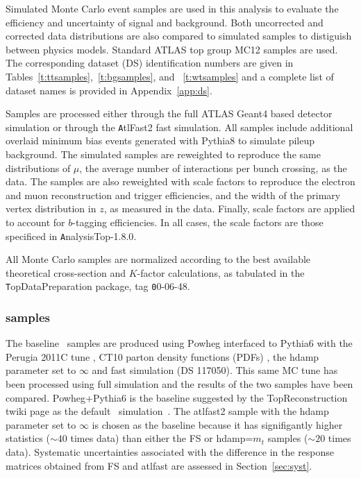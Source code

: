 Simulated Monte Carlo event samples are used in this analysis to evaluate the efficiency and uncertainty of signal and background.  Both uncorrected and corrected data distributions are also compared to simulated samples to distiguish between physics models. 
Standard ATLAS top group MC12 samples are used.~\cite{topmc} The corresponding dataset (DS) identification numbers are given  in Tables~\ref{t:ttsamples},~\ref{t:bgsamples}, and ~\ref{t:wtsamples} and a complete list of dataset names is provided in Appendix~\ref{app:ds}.

Samples are processed either through the full ATLAS Geant4\cite{bib:g4} based detector simulation or through the {\texttt AtlFast2}\cite{atlfast2} fast simulation. All samples include additional overlaid minimum bias events generated with {\textsc  Pythia8} \cite{pythia8} to simulate pileup background. 
The simulated samples are reweighted to reproduce the same distributions of $\mu$, the average number of interactions per bunch crossing, as the data. The samples are also reweighted with scale factors to reproduce the electron and muon reconstruction and trigger efficiencies, and the width of the primary vertex distribution in $z$, as measured in the data. Finally, scale factors are applied to account for $b$-tagging efficiencies.  In all cases,
the scale factors are those specificed in {\texttt AnalysisTop-1.8.0}.

All Monte Carlo samples are normalized according to the best available theoretical cross-section and $K$-factor calculations, as tabulated in the {\texttt TopDataPreparation} package, tag {\texttt 00-06-48}.

\subsubsection{\ttbar samples}\label{ss:mcsignal}

The baseline \ttbar\ samples are produced using {\textsc  Powheg} \cite{Powheg, Powheg2, Powheg3, Powheg4} interfaced to {\textsc  Pythia6} \cite{pythia6} with the Perugia 2011C tune \cite{perugia}, CT10 parton density functions (PDFs) \cite{cttenpdf}, the hdamp parameter set to $\infty$ and fast simulation (DS 117050).  
This same MC tune has been processed using full simulation and the results of the two samples have been compared.
{\textsc  Powheg}+{\textsc  Pythia6} is the baseline suggested by the TopReconstruction twiki page as the default \ttbar\ simulation~\cite{topmc}. The atlfast2 sample with the hdamp parameter set to $\infty$ is chosen as the baseline because it has signifigantly higher statistics ($\sim 40$ times data) than either the FS or hdamp=$m_t$ samples ($\sim 20$ times data).
Systematic uncertainties associated with the difference in the response matrices obtained from FS and atlfast are
assessed in Section~\ref{sec:syst}.


